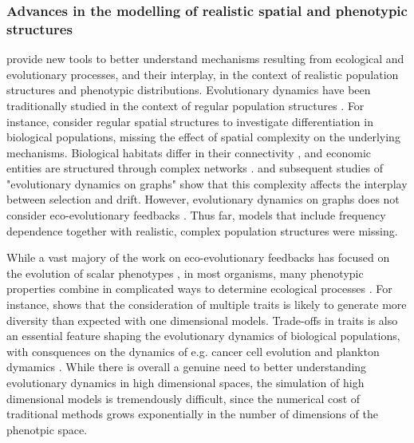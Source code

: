 \subsubsection{Advances in the modelling of realistic spatial and phenotypic structures}

\Cref{\chapi,\chapiv} provide new tools to better understand mechanisms resulting from ecological and evolutionary processes, and their interplay, in the context of realistic population structures and phenotypic distributions.
% 
Evolutionary dynamics have been traditionally studied in the context of regular population structures \citep{LiebermanHauert2005}.
% 
For instance, \cite{Slatkin1973,Slatkin1978,Kirkpatrick1997,Polechova2015,Polechova2018,AndradeRestrepo2019,Doebeli2003,Meszena1997,Yeaman2011,Debarre2013,Mirrahimi2020} consider regular spatial structures to investigate differentiation in biological populations, missing the effect of spatial complexity on the underlying mechanisms.
% 
Biological habitats differ in their connectivity \xxx, and economic entities are structured through complex networks \xxx. \cite{LiebermanHauert2005} and subsequent studies of "evolutionary dynamics on graphs" \xxx show that this complexity affects the interplay between selection and drift. However, evolutionary dynamics on graphs does not consider eco-evolutionary feedbacks \citep{Govaert2019a}.
% 
Thus far, models that include frequency dependence together with realistic, complex population structures were missing.

While a vast majory of the work on eco-evolutionary feedbacks has focused on the evolution of scalar phenotypes \citep{Doebeli2011}, in most organisms, many phenotypic properties combine in complicated ways to determine ecological processes \citep{Doebeli2014}.
% 
For instance, \cite{Doebeli2011} shows that the consideration of multiple traits is likely to generate more diversity than expected with one dimensional models.
% 
% 
Trade-offs in traits is also an essential feature shaping the evolutionary dynamics of biological populations, with consquences on the dynamics of e.g. cancer cell evolution \xxx and plankton dymamics \xxx.
% 
While there is overall a genuine need to better understanding evolutionary dynamics in high dimensional spaces, the simulation of high dimensional models is tremendously difficult, since the numerical cost of traditional methods grows exponentially in the number of dimensions of the phenotpic space. 
% 

